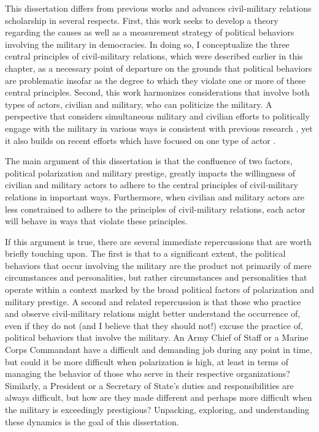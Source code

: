 \documentclass[
  12pt,
  oneside]{memoir}
\begin{document}
This dissertation differs from previous works and advances civil-military relations scholarship in several respects. First, this work seeks to develop a theory regarding the causes as well as a measurement strategy of political behaviors involving the military in democracies. In doing so, I conceptualize the three central principles of civil-military relations, which were described earlier in this chapter, as a necessary point of departure on the grounds that political behaviors are problematic insofar as the degree to which they violate one or more of these central principles. Second, this work harmonizes considerations that involve both types of actors, civilian and military, who can politicize the military. A perspective that considers simultaneous military and civilian efforts to politically engage with the military in various ways is consistent with previous research \autocite{bove_beyond_2020}, yet it also builds on recent efforts which have focused on one type of actor \autocites[for recent scholarship describing civilian politicization of the military, see][]{karlin_case_2020,golby_uncivil-military_2021}.

The main argument of this dissertation is that the confluence of two factors, political polarization and military prestige, greatly impacts the willingness of civilian and military actors to adhere to the central principles of civil-military relations in important ways. Furthermore, when civilian and military actors are less constrained to adhere to the principles of civil-military relations, each actor will behave in ways that violate these principles.

If this argument is true, there are several immediate repercussions that are worth briefly touching upon. The first is that to a significant extent, the political behaviors that occur involving the military are the product not primarily of mere circumstances and personalities, but rather circumstances and personalities that operate within a context marked by the broad political factors of polarization and military prestige. A second and related repercussion is that those who practice and observe civil-military relations might better understand the occurrence of, even if they do not (and I believe that they should not!) excuse the practice of, political behaviors that involve the military. An Army Chief of Staff or a Marine Corps Commandant have a difficult and demanding job during any point in time, but could it be more difficult when polarization is high, at least in terms of managing the behavior of those who serve in their respective organizations? Similarly, a President or a Secretary of State's duties and responsibilities are always difficult, but how are they made different and perhaps more difficult when the military is exceedingly prestigious? Unpacking, exploring, and understanding these dynamics is the goal of this dissertation.
\end{document}

